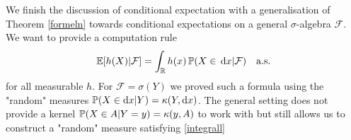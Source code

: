 We finish the discussion of conditional expectation with a generalisation of Theorem \ref{formeln} towards conditional expectations on a general $\sigma$-algebra $\mathcal F$. We want to provide a computation rule
\begin{align}\label{integrall}
	\E[h(X)|\mathcal F]=\int_\R h(x) \,\P(X\in \dint x|\mathcal F)\quad \text{a.s.}
\end{align}	
 for all measurable $h$. For $\mathcal F=\sigma(Y)$ we proved such a formula using the "{}random"{} measures $\P(X\in \mathrm d x|Y)=\kappa(Y,\mathrm dx)$. The general setting does not provide a kernel $\P(X\in A|Y=y)=\kappa(y,A)$ to work with but still allows us to construct a "{}random"{} measure  satisfying \eqref{integrall}
 
% 
		
